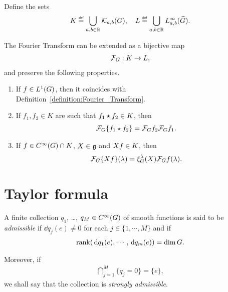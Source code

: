 \begin{proposition}
    Define the sets
    \begin{align*}
        K \defeq \bigcup_{a, b \in \R} \KernelsSobolev{a}{b}, \quad
        L \defeq \bigcup_{a, b \in \R} \LebesgueDual[a, b]{\infty}{\Group}.
    \end{align*}

    The Fourier Transform can be extended as a bijective map
    \begin{align*}
        \mathcal{F}_{G} : K \to L,
    \end{align*}
    and preserve the following properties.
    \begin{enumerate}
        \item If $f \in {L^{1} (G)}$, then it coincides with Definition~\ref{definition:Fourier_Transform}.
        \item If $f_1, f_2 \in K$ are such that $f_1 \star f_2 \in K$, then
            \begin{align*}
                \mathcal{F}_{G}\{f_1 \star f_2\} = \mathcal{F}_{G} f_2 \mathcal{F}_{G} f_1.
            \end{align*}
        \item If $f \in {C^\infty(G)} \cap K$, $X \in \mathfrak{g}$ and ${X} f \in K$, then
            \begin{align*}
                \mathcal{F}_{G}\{{X} f\}(\lambda) = \xi^{\lambda}_{G}(X) \mathcal{F}_{G} f(\lambda).
            \end{align*}
    \end{enumerate}
\end{proposition}

\section{Taylor formula}

\begin{definition}
\label{definition:admissibility_of_polynomials}
    A finite collection $q_1$, \dots, $q_M \in {C^\infty(G)}$ of smooth functions is said to be \emph{admissible}
    if $\dd q_j(e) \neq 0$ for each $j \in \{1, \cdots, M\}$
    and if
    \begin{align*}
        \operatorname{rank}(\,\mathrm{d} q_1(e), \cdots, \,\mathrm{d} q_m(e)) = \dim G.
    \end{align*}

    Moreover, if
    \begin{align*}
        \bigcap_{j = 1}^M \{ q_j = 0 \} = \{e\},
    \end{align*}
    we shall say that the collection is \emph{strongly admissible}.
\end{definition}

